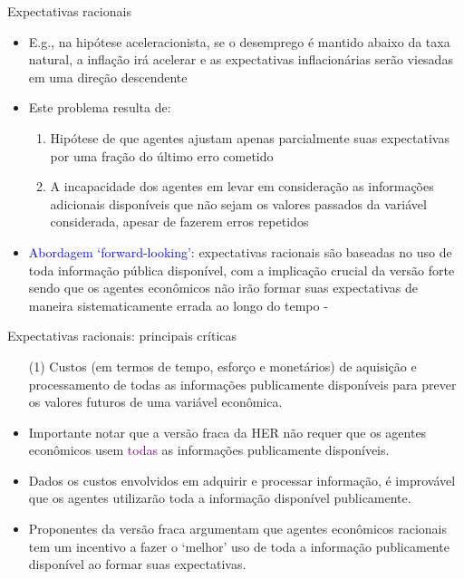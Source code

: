 \documentclass[10pt]{beamer}
\begin{document}
\begin{frame}{Expectativas racionais}
    \begin{itemize}
        \item E.g., na hipótese aceleracionista, se o desemprego é mantido abaixo da taxa natural, a inflação irá acelerar e as expectativas inflacionárias serão viesadas em uma direção descendente
        \bigskip
        \item Este problema resulta de:
        \bigskip
        \begin{enumerate}
            \item Hipótese de que agentes ajustam apenas parcialmente suas expectativas por uma fração do último erro cometido
            \medskip
            \item A incapacidade dos agentes em levar em consideração as informações adicionais disponíveis que não sejam os valores passados da variável considerada, apesar de fazerem erros repetidos            
        \end{enumerate}
        \bigskip
        \item \textcolor{blue}{Abordagem `forward-looking'}: expectativas racionais são baseadas no uso de toda informação pública disponível, com a implicação crucial da versão forte sendo que os agentes econômicos não irão formar suas expectativas de maneira sistematicamente errada ao longo do tempo -         
    \end{itemize}
\end{frame}

\begin{frame}{Expectativas racionais: principais críticas}
    \begin{itemize}
        \item[(1)] Custos (em termos de tempo, esforço e monetários) de aquisição e processamento de todas as informações publicamente disponíveis para prever os valores futuros de uma variável econômica.
        \bigskip
        \item Importante notar que a versão fraca da HER não requer que os agentes econômicos usem \textcolor{purple}{todas} as informações publicamente disponíveis.
        \bigskip
        \item Dados os custos envolvidos em adquirir e processar informação, é improvável que os agentes utilizarão toda a informação disponível publicamente.
        \bigskip
        \item Proponentes da versão fraca argumentam que agentes econômicos racionais tem um incentivo a fazer o `melhor' uso de toda a informação publicamente disponível ao formar suas expectativas.
    \end{itemize}
\end{frame}
\end{document}
